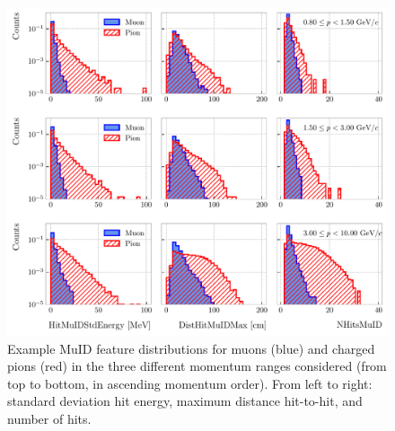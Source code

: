 \begin{figure}[t]
	\centering
	\includegraphics[width=.95\linewidth]{Images/GArSoft_PID/BDT/muid_feature_distribution_all_example.pdf}
	\caption[Example MuID feature distributions for muons and charged pions in the three different momentum ranges considered.]{Example MuID feature distributions for muons (blue) and charged pions (red) in the three different momentum ranges considered (from top to bottom, in ascending momentum order). From left to right: standard deviation hit energy, maximum distance hit-to-hit, and number of hits.}
	\label{fig:muid_feature_example}
\end{figure}

